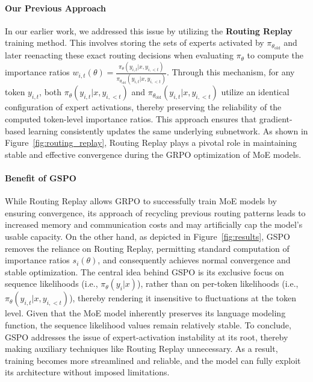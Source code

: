 \paragraph{Our Previous Approach} In our earlier work, we addressed this issue by utilizing the \textbf{Routing Replay} training method. This involves storing the sets of experts activated by $\pi_{\theta_\text{old}}$ and later reenacting these exact routing decisions when evaluating $\pi_{\theta}$ to compute the importance ratios $w_{i,t}(\theta) = \frac{ \pi_{\theta} (y_{i,t} | x, y_{i,<t}) }{ \pi_{\theta_\text{old}} (y_{i,t} | x,y_{i,<t})}$. Through this mechanism, for any token $y_{i,t}$, both $\pi_{\theta} (y_{i,t} | x, y_{i,<t})$ and $\pi_{\theta_\text{old}} (y_{i,t} | x, y_{i,<t})$ utilize an identical configuration of expert activations, thereby preserving the reliability of the computed token-level importance ratios. This approach ensures that gradient-based learning consistently updates the same underlying subnetwork. As shown in Figure~\ref{fig:routing_replay}, Routing Replay plays a pivotal role in maintaining stable and effective convergence during the GRPO optimization of MoE models.

\paragraph{Benefit of GSPO} While Routing Replay allows GRPO to successfully train MoE models by ensuring convergence, its approach of recycling previous routing patterns leads to increased memory and communication costs and may artificially cap the model's usable capacity. On the other hand, as depicted in Figure~\ref{fig:results}, GSPO removes the reliance on Routing Replay, permitting standard computation of importance ratios $s_i(\theta)$, and consequently achieves normal convergence and stable optimization. The central idea behind GSPO is its exclusive focus on sequence likelihoods (i.e., $\pi_{\theta} (y_i | x)$), rather than on per-token likelihoods (i.e., $\pi_{\theta} (y_{i,t} | x, y_{i,<t})$), thereby rendering it insensitive to fluctuations at the token level. Given that the MoE model inherently preserves its language modeling function, the sequence likelihood values remain relatively stable. To conclude, GSPO addresses the issue of expert-activation instability at its root, thereby making auxiliary techniques like Routing Replay unnecessary. As a result, training becomes more streamlined and reliable, and the model can fully exploit its architecture without imposed limitations.

